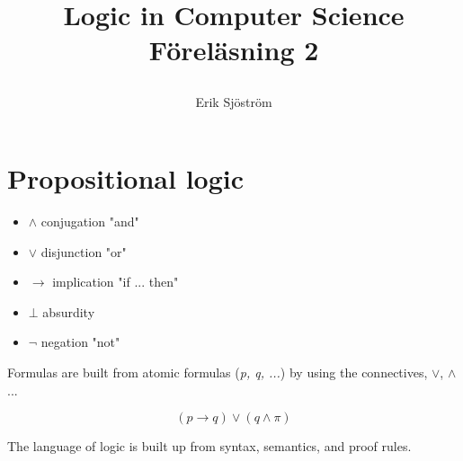 
\usepackage{bussproofs}
\usepackage{natded}

\title{
	 Logic in Computer Science\\
	 Föreläsning 2
    \author{Erik Sjöström}
}

\maketitle

\section{Propositional logic} %
\label{sec:propositional_logic}
\begin{itemize}
    \item $\land$ conjugation "and"
    \item $\lor$ disjunction "or"
    \item $\rightarrow$ implication "if ... then"
    \item $\bot$ absurdity
    \item $\neg$ negation "not"
\end{itemize}
Formulas are built from atomic formulas (\textit{p, q, ...}) by using the connectives, $\lor$, $\land$...
\begin{Ex}
    \[
    (p \rightarrow q) \lor (q \land \pi)
    \]
\end{Ex}
The language of logic is built up from syntax, semantics, and proof rules.
